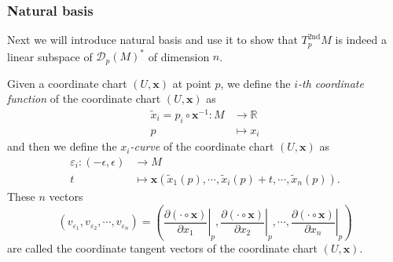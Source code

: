 \documentclass{report}
\begin{document}
\subsubsection{Natural basis}
Next we will introduce natural basis and use it to show that $T^{2\mathrm{nd}}_pM$ is indeed a linear subspace of $\mathcal{D}_p(M)^*$ of dimension $n$.

Given a coordinate chart $(U,\mathbf{x})$ at point $p$, we define the \emph{$i$-th coordinate function} of the coordinate chart $(U,\mathbf{x})$ as
\[
    \begin{aligned}
        \tilde{x}_i=p_i\circ \mathbf{x}^{-1}:M&\longrightarrow \mathbb{R}\\
        p&\longmapsto x_i
    \end{aligned}
\]
and then we define the \emph{$x_i$-curve} of the coordinate chart $(U,\mathbf{x})$ as
\[
    \begin{aligned}
        \varepsilon_i:(-\epsilon,\epsilon)&\longrightarrow M\\
        t&\longmapsto\mathbf{x}\left(\tilde{x}_1(p),\cdots,\tilde{x}_i(p)+t,\cdots,\tilde{x}_n(p)\right).
    \end{aligned}
\]
These $n$ vectors
\[
    (v_{\varepsilon_1},v_{\varepsilon_2},\cdots,v_{\varepsilon_n})=\left(\left.\frac{\partial (\cdot \circ \mathbf{x})}{\partial x_1}\right|_{p},\left.\frac{\partial (\cdot \circ \mathbf{x})}{\partial x_2}\right|_{p},\cdots,\left.\frac{\partial (\cdot \circ \mathbf{x})}{\partial x_n}\right|_{p}\right)
\]
are called the coordinate tangent vectors of the coordinate chart $(U,\mathbf{x})$.
\newpage

\end{document}
